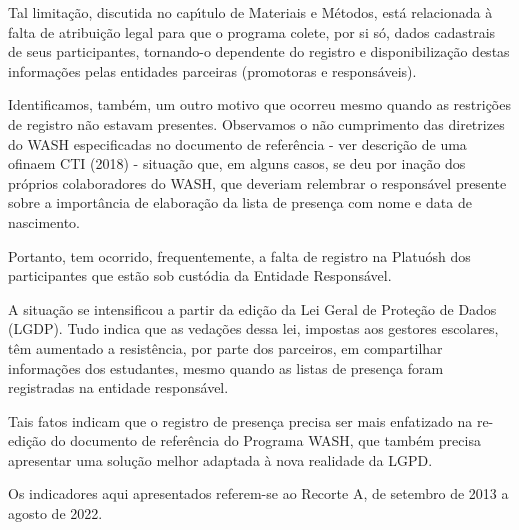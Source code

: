 \documentclass[
12pt,		%
openright,	%
twoside,  %
a4paper,			%
chapter=TITLE,		%
english,			%
french,				%
spanish,			%
brazil				%
]{USPSC-classe/USPSC}
\begin{document}
Tal limita\c{c}\~ao, discutida no cap\'{\i}tulo de Materiais e M\'etodos, est\'a relacionada \`a falta de atribui\c{c}\~ao legal para que o programa colete, por si s\'o, dados cadastrais de seus participantes, tornando-o dependente do registro e disponibiliza\c{c}\~ao destas informa\c{c}\~oes pelas entidades parceiras (promotoras e respons\'aveis).








Identificamos, tamb\'em, um outro motivo que ocorreu mesmo quando as restri\c{c}\~oes de registro n\~ao estavam presentes. Observamos o n\~ao cumprimento das diretrizes do WASH especificadas no documento de refer\^encia - ver \textquotedbl descri\c{c}\~ao de uma ofina\textquotedbl  em  CTI (2018) - situa\c{c}\~ao que, em alguns casos, se deu por ina\c{c}\~ao dos pr\'oprios colaboradores do WASH, que deveriam relembrar o respons\'avel presente sobre a import\^ancia de elabora\c{c}\~ao da lista de presen\c{c}a com nome e data de nascimento.








Portanto, tem ocorrido, frequentemente, a falta de registro na Platu\'osh dos participantes que est\~ao sob cust\'odia da Entidade Respons\'avel.








A situa\c{c}\~ao se intensificou a partir da edi\c{c}\~ao da Lei Geral de Prote\c{c}\~ao de Dados (LGDP). Tudo indica que as veda\c{c}\~oes dessa lei, impostas aos gestores escolares, t\^em aumentado a resist\^encia, por parte dos parceiros, em compartilhar informa\c{c}\~oes dos estudantes, mesmo quando as listas de presen\c{c}a foram registradas na entidade respons\'avel.








Tais fatos indicam que o registro de presen\c{c}a precisa ser mais enfatizado na re-edi\c{c}\~ao do documento de refer\^encia do Programa WASH, que tamb\'em precisa apresentar uma solu\c{c}\~ao melhor adaptada \`a nova realidade da LGPD.








Os indicadores aqui apresentados referem-se ao Recorte A, de setembro de 2013 a agosto de 2022.
\end{document}
